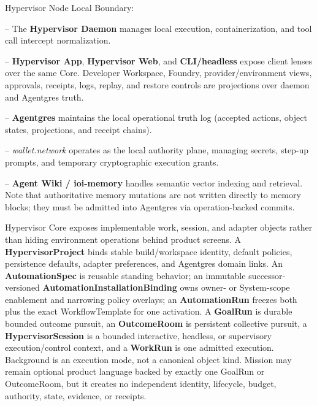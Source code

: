 \documentclass[
  11pt,
]{article}
\begin{document}
Hypervisor Node Local Boundary:

-- The \textbf{Hypervisor Daemon} manages local execution,
containerization, and tool call intercept normalization.

-- \textbf{Hypervisor App}, \textbf{Hypervisor Web}, and
\textbf{CLI/headless} expose client lenses over the same Core. Developer Workspace,
Foundry, provider/environment views, approvals, receipts, logs, replay,
and restore controls are projections over daemon and Agentgres truth.

-- \textbf{Agentgres} maintains the local operational truth log
(accepted actions, object states, projections, and receipt chains).

-- \emph{wallet.network} operates as the local authority plane, managing
secrets, step-up prompts, and temporary cryptographic execution grants.

-- \textbf{Agent Wiki / ioi-memory} handles semantic vector indexing and
retrieval. Note that authoritative memory mutations are not written
directly to memory blocks; they must be admitted into Agentgres via
operation-backed commits.

Hypervisor Core exposes implementable work, session, and adapter objects rather
than hiding environment operations behind product screens. A
\textbf{HypervisorProject} binds stable build/workspace identity, default
policies, persistence defaults, adapter preferences, and Agentgres domain
links. An \textbf{AutomationSpec} is reusable standing behavior; an
immutable successor-versioned \textbf{AutomationInstallationBinding} owns
owner- or System-scope enablement and narrowing policy overlays; an
\textbf{AutomationRun} freezes both plus the exact WorkflowTemplate for one
activation. A \textbf{GoalRun} is durable
bounded outcome pursuit, an \textbf{OutcomeRoom} is persistent collective
pursuit, a \textbf{HypervisorSession} is a bounded interactive, headless, or
supervisory execution/control context, and a \textbf{WorkRun} is one admitted
execution. Background is an execution mode, not a canonical object kind.
Mission may remain optional product language backed by exactly one GoalRun or
OutcomeRoom, but it creates no independent identity, lifecycle, budget,
authority, state, evidence, or receipts.
\end{document}
